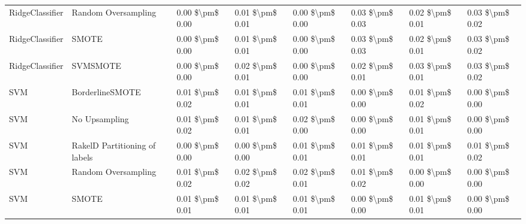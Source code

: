 \begin{tabular}{llllllll}
                RidgeClassifier &           Random Oversampling & 0.00 \$\textbackslash pm\$ 0.00 &           0.01 \$\textbackslash pm\$ 0.01 &       0.00 \$\textbackslash pm\$ 0.00 &        0.03 \$\textbackslash pm\$ 0.03 &                         0.02 \$\textbackslash pm\$ 0.01 & 0.03 \$\textbackslash pm\$ 0.02 \\
                RidgeClassifier &                         SMOTE & 0.00 \$\textbackslash pm\$ 0.00 &           0.01 \$\textbackslash pm\$ 0.01 &       0.00 \$\textbackslash pm\$ 0.00 &        0.03 \$\textbackslash pm\$ 0.03 &                         0.02 \$\textbackslash pm\$ 0.01 & 0.03 \$\textbackslash pm\$ 0.02 \\
                RidgeClassifier &                      SVMSMOTE & 0.00 \$\textbackslash pm\$ 0.00 &           0.02 \$\textbackslash pm\$ 0.01 &       0.00 \$\textbackslash pm\$ 0.00 &        0.02 \$\textbackslash pm\$ 0.01 &                         0.03 \$\textbackslash pm\$ 0.01 & 0.03 \$\textbackslash pm\$ 0.02 \\
                            SVM &               BorderlineSMOTE & 0.01 \$\textbackslash pm\$ 0.02 &           0.01 \$\textbackslash pm\$ 0.01 &       0.01 \$\textbackslash pm\$ 0.01 &        0.00 \$\textbackslash pm\$ 0.00 &                         0.01 \$\textbackslash pm\$ 0.02 & 0.00 \$\textbackslash pm\$ 0.00 \\
                            SVM &                 No Upsampling & 0.01 \$\textbackslash pm\$ 0.02 &           0.01 \$\textbackslash pm\$ 0.01 &       0.02 \$\textbackslash pm\$ 0.00 &        0.00 \$\textbackslash pm\$ 0.00 &                         0.01 \$\textbackslash pm\$ 0.01 & 0.00 \$\textbackslash pm\$ 0.00 \\
                            SVM & RakelD Partitioning of labels & 0.00 \$\textbackslash pm\$ 0.00 &           0.00 \$\textbackslash pm\$ 0.00 &       0.01 \$\textbackslash pm\$ 0.01 &        0.01 \$\textbackslash pm\$ 0.01 &                         0.01 \$\textbackslash pm\$ 0.01 & 0.01 \$\textbackslash pm\$ 0.02 \\
                            SVM &           Random Oversampling & 0.01 \$\textbackslash pm\$ 0.02 &           0.02 \$\textbackslash pm\$ 0.02 &       0.02 \$\textbackslash pm\$ 0.01 &        0.01 \$\textbackslash pm\$ 0.02 &                         0.00 \$\textbackslash pm\$ 0.00 & 0.00 \$\textbackslash pm\$ 0.00 \\
                            SVM &                         SMOTE & 0.01 \$\textbackslash pm\$ 0.01 &           0.01 \$\textbackslash pm\$ 0.01 &       0.01 \$\textbackslash pm\$ 0.01 &        0.00 \$\textbackslash pm\$ 0.00 &                         0.01 \$\textbackslash pm\$ 0.01 & 0.00 \$\textbackslash pm\$ 0.00 \\

\end{tabular}
